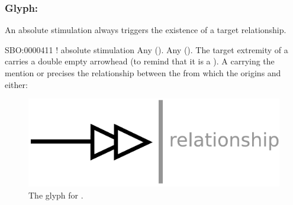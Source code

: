 
\subsubsection{Glyph: }\label{sec:absoluteStimulation}

An absolute stimulation always triggers the existence of a target relationship. 

\begin{glyphDescription}
 \glyphSboTerm SBO:0000411 ! absolute stimulation
 \glyphOrigin Any  ().
 \glyphTarget Any  ().
 \glyphEndPoint The target extremity of a  carries a double empty arrowhead (to remind that it is a ).
 \glyphAux A  carrying the mention  or  precises the relationship between the  from which the  origins and either:
 \end{glyphDescription}

\begin{figure}[H]
  \centering
  \includegraphics[scale = 0.5]{images/absoluteStimulation}
  \caption{The \ER glyph for .}
  \label{fig:absoluteStimulation}
\end{figure}

